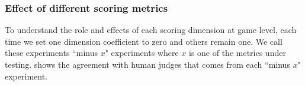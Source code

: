 
 


\subsubsection{Effect of different scoring metrics}
To understand the role and effects of each
scoring dimension at game level, 
each time we set one dimension coefficient to zero
and others remain one. We call these experiments
``minus $x$" experiments where $x$ is one of the 
metrics under testing.  
 shows the agreement with human judges 
that comes from each ``minus $x$" experiment. 


